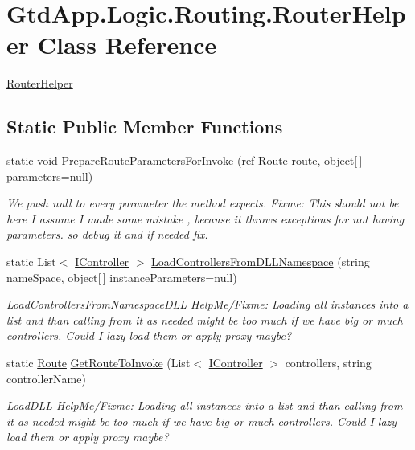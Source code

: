 \hypertarget{class_gtd_app_1_1_logic_1_1_routing_1_1_router_helper}{}\section{Gtd\+App.\+Logic.\+Routing.\+Router\+Helper Class Reference}
\label{class_gtd_app_1_1_logic_1_1_routing_1_1_router_helper}


\mbox{\hyperlink{class_gtd_app_1_1_logic_1_1_routing_1_1_router_helper}{Router\+Helper}}  


\subsection*{Static Public Member Functions}
\begin{DoxyCompactItemize}
\item 
static void \mbox{\hyperlink{class_gtd_app_1_1_logic_1_1_routing_1_1_router_helper_a30034fc82c4843ddba655438c2f6b031}{Prepare\+Route\+Parameters\+For\+Invoke}} (ref \mbox{\hyperlink{class_gtd_app_1_1_logic_1_1_routing_1_1_route}{Route}} route, object\mbox{[}$\,$\mbox{]} parameters=null)
\begin{DoxyCompactList}\small\item\em We push null to every parameter the method expects. Fixme\+: This should not be here I assume I made some mistake , because it throws exceptions for not having parameters. so debug it and if needed fix. \end{DoxyCompactList}\item 
static List$<$ \mbox{\hyperlink{interface_gtd_app_1_1_logic_1_1_interfaces_1_1_i_controller}{I\+Controller}} $>$ \mbox{\hyperlink{class_gtd_app_1_1_logic_1_1_routing_1_1_router_helper_aa2d42769c4ecafc695851531d12e72d7}{Load\+Controllers\+From\+D\+L\+L\+Namespace}} (string name\+Space, object\mbox{[}$\,$\mbox{]} instance\+Parameters=null)
\begin{DoxyCompactList}\small\item\em Load\+Controllers\+From\+Namespace\+D\+LL Help\+Me/\+Fixme\+: Loading all instances into a list and than calling from it as needed might be too much if we have big or much controllers. Could I lazy load them or apply proxy maybe? \end{DoxyCompactList}\item 
static \mbox{\hyperlink{class_gtd_app_1_1_logic_1_1_routing_1_1_route}{Route}} \mbox{\hyperlink{class_gtd_app_1_1_logic_1_1_routing_1_1_router_helper_ade163328e0a503113580b0d107a10fb4}{Get\+Route\+To\+Invoke}} (List$<$ \mbox{\hyperlink{interface_gtd_app_1_1_logic_1_1_interfaces_1_1_i_controller}{I\+Controller}} $>$ controllers, string controller\+Name)
\begin{DoxyCompactList}\small\item\em Load\+D\+LL Help\+Me/\+Fixme\+: Loading all instances into a list and than calling from it as needed might be too much if we have big or much controllers. Could I lazy load them or apply proxy maybe? \end{DoxyCompactList}\end{DoxyCompactItemize}
